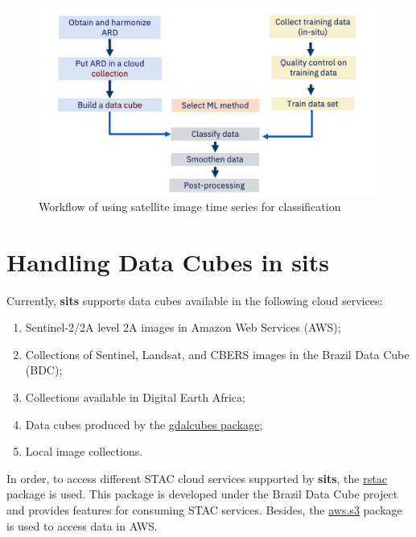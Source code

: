 \documentclass[a4paper,]{tufte-book}
\providecommand{\tightlist}{%
  \setlength{\itemsep}{0pt}\setlength{\parskip}{0pt}}
\begin{document}
\begin{figure}

{\centering \includegraphics[width=0.8\linewidth,height=0.8\textheight]{images/sits_workflow} 

}

\caption[Workflow of using satellite image time series for classification]{Workflow of using satellite image time series for classification}\label{fig:unnamed-chunk-6}
\end{figure}

\hypertarget{handling-data-cubes-in-sits}{%
\section{\texorpdfstring{Handling Data Cubes in \textbf{sits}}{Handling Data Cubes in sits}}\label{handling-data-cubes-in-sits}}

Currently, \textbf{sits} supports data cubes available in the following cloud services:

\begin{enumerate}
\def\labelenumi{\arabic{enumi}.}
\tightlist
\item
  Sentinel-2/2A level 2A images in Amazon Web Services (AWS);
\item
  Collections of Sentinel, Landsat, and CBERS images in the Brazil Data Cube (BDC);
\item
  Collections available in Digital Earth Africa;
\item
  Data cubes produced by the \href{https://github.com/appelmar/gdalcubes}{gdalcubes package};
\item
  Local image collections.
\end{enumerate}

In order, to access different STAC cloud services supported by \textbf{sits}, the \href{http://github.com/brazil-data-cube/rstac}{rstac} package is used. This package is developed under the Brazil Data Cube project and provides features for consuming STAC services. Besides, the \href{https://github.com/cloudyr/aws.s3}{aws.s3} package is used to access data in AWS.
\end{document}

